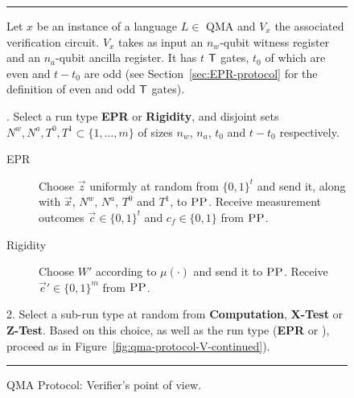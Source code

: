 \begin{figure}[H]
\rule[1ex]{\textwidth}{0.5pt}
\vspace{-20pt}
\justify
Let $x$ be an instance of a language $L \in$ QMA and $V_x$ the associated verification circuit. $V_x$ takes as input  an $n_w$-qubit witness register and an $n_a$-qubit ancilla register. It has $t$ $\sf T$ gates, $t_0$ of which are even and $t-t_0$ are odd (see Section~\ref{sec:EPR-protocol} for the definition of even and odd $\sf T$ gates).

. Select a run type \textbf{EPR} or \textbf{Rigidity}, and disjoint sets
  $N^w,N^a, T^0,T^1\subset \{1,\ldots,m\}$ of sizes $n_w$, $n_a$,  $t_0$ and $t-t_0$ respectively. 
\begin{description}
\item[EPR] Choose $\vec{z}$ uniformly at random from $\{0,1\}^t$ and send it,
  along with $\vec{x}$, $N^w$, $N^a$, $T^0$ and $T^1$, to $\textsc{PP}$. Receive measurement outcomes $\vec{c}\in\{0,1\}^t$ and $c_f\in\{0,1\}$ from $\textsc{PP}$.
\item[Rigidity] Choose $W'$ according to $\mu(\cdot)$ and send it to $\textsc{PP}$. Receive $\vec{e}'\in \{0,1\}^m$ from $\textsc{PP}$. 
\end{description}
2. Select a sub-run type at random from \textbf{Computation}, \textbf{X-Test} or \textbf{Z-Test}. Based on this choice, as well as the run type (\textbf{EPR} or ), proceed as in Figure~\ref{fig:qma-protocol-V-continued}). \\
\rule[2ex]{\textwidth}{0.5pt}\vspace{-.5cm}
\caption{QMA Protocol: Verifier's point of view.}\label{fig:qma-protocol-V}
\end{figure}


